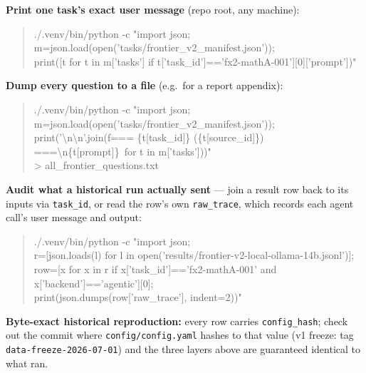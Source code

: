\documentclass[11pt]{article}
\newcommand{\field}[1]{\texttt{#1}}
\begin{document}
\textbf{Print one task's exact user message} (repo root, any machine):
\begin{quote}\ttfamily\small
./.venv/bin/python -c "import json; \\
\hspace*{1em}m=json.load(open('tasks/frontier\_v2\_manifest.json')); \\
\hspace*{1em}print([t for t in m['tasks'] if t['task\_id']=='fx2-mathA-001'][0]['prompt'])"
\end{quote}

\textbf{Dump every question to a file} (e.g.\ for a report appendix):
\begin{quote}\ttfamily\small
./.venv/bin/python -c "import json; \\
\hspace*{1em}m=json.load(open('tasks/frontier\_v2\_manifest.json')); \\
\hspace*{1em}print('\textbackslash n\textbackslash n'.join(f\textquotesingle=== \{t[\textquotesingle task\_id\textquotesingle]\} (\{t[\textquotesingle source\_id\textquotesingle]\}) ===\textbackslash n\{t[\textquotesingle prompt\textquotesingle]\}\textquotesingle\ for t in m['tasks']))" \\
\hspace*{1em}> all\_frontier\_questions.txt
\end{quote}

\textbf{Audit what a historical run actually sent} --- join a result row back to its
inputs via \field{task\_id}, or read the row's own \field{raw\_trace}, which
records each agent call's user message and output:
\begin{quote}\ttfamily\small
./.venv/bin/python -c "import json; \\
\hspace*{1em}r=[json.loads(l) for l in open('results/frontier-v2-local-ollama-14b.jsonl')]; \\
\hspace*{1em}row=[x for x in r if x['task\_id']=='fx2-mathA-001' and x['backend']=='agentic'][0]; \\
\hspace*{1em}print(json.dumps(row['raw\_trace'], indent=2))"
\end{quote}

\textbf{Byte-exact historical reproduction:} every row carries
\field{config\_hash}; check out the commit where \texttt{config/config.yaml}
hashes to that value (v1 freeze: tag \texttt{data-freeze-2026-07-01}) and the
three layers above are guaranteed identical to what ran.
\end{document}
